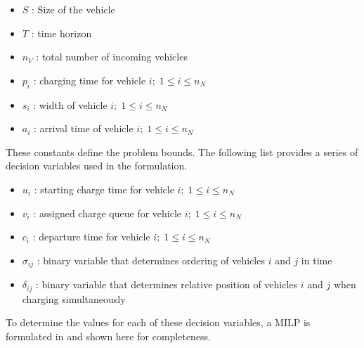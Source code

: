 \documentclass[utf8]{FrontiersinHarvard}
\let\cite\citep                                                                 %
\begin{document}
\begin{itemize}
	\item $S$   : Size of the vehicle
	\item $T$   : time horizon
	\item $n_V$ : total number of incoming vehicles
	\item $p_i$ : charging time for vehicle $i;\; 1 \leq i \leq n_N$
	\item $s_i$ : width of vehicle $i;\; 1 \leq i \leq n_N$
	\item $a_i$ : arrival time of vehicle $i;\; 1 \leq i \leq n_N$
\end{itemize}

These constants define the problem bounds. The following list provides a series of decision variables used in the
formulation.

\begin{itemize}
    \item $u_i$    : starting charge time for vehicle $i;\; 1 \leq i \leq n_N$
    \item $v_i$    : assigned charge queue for vehicle $i;\; 1 \leq i \leq n_N$
    \item $c_i$    : departure time for vehicle $i;\; 1 \leq i \leq n_N$
    \item $\sigma_{ij}$ : binary variable that determines ordering of vehicles $i$ and $j$ in time
    \item $\delta_{ij}$ : binary variable that determines relative position of vehicles $i$ and $j$ when charging simultaneously
\end{itemize}

To determine the values for each of these decision variables, a MILP is formulated in \cite{Qarebagh2019} and shown
here for completeness.
\end{document}
